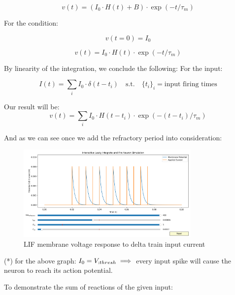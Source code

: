 \begin{equation}
	v(t) = (I_0 \cdot H(t) + B) \cdot \exp(-t/\tau_m)
\end{equation}

For the condition: 

\begin{equation}
	v(t=0) = I_0
\end{equation}

\begin{equation}
	v(t) = I_0 \cdot H(t) \cdot \exp(-t/\tau_m)
\end{equation}

By linearity of the integration, we conclude the following:
For the input:

\begin{equation}
	I(t) = \sum_i I_0 \cdot \delta(t-t_i) \quad \text{s.t.} \quad \{t_i\}_i = \text{input firing times}
\end{equation}

Our result will be:
\begin{equation}
	v(t) = \sum_i I_0 \cdot H(t-t_i) \cdot \exp(-(t-t_i)/\tau_m)
\end{equation}

And as we can see once we add the refractory period into consideration:

\begin{figure}[H]
    \centering
    \includegraphics[width=0.8\textwidth]{methods/computational-models/graphs/LIF-spike-response-ref.png}
    \caption{LIF membrane voltage response to delta train input current}
    \label{fig:LIF-spike-ref}
\end{figure}

(*) for the above graph: \( I_0=V_{\text:thresh} \implies \) every input spike will cause the neuron to reach its action potential.

To demonstrate the sum of reactions of the given input:

